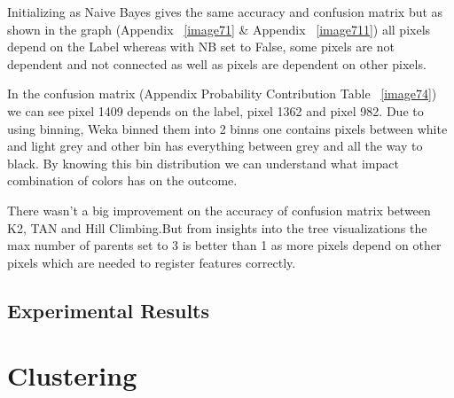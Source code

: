\documentclass[11pt]{article}
\begin{document}
Initializing as Naive Bayes gives the same accuracy and confusion matrix but as shown in the graph (Appendix ~\ref{image71} \& Appendix ~\ref{image711}) all pixels depend on the Label whereas with NB set to False, some pixels are not dependent and not connected as well as pixels are dependent on other pixels.

In the confusion matrix (Appendix Probability Contribution Table ~\ref{image74}) we can see pixel 1409 depends on the label, pixel 1362 and pixel 982. Due to using binning, Weka binned them into 2 binns one contains pixels between white and light grey and other bin has everything between grey and all the way to black. By knowing this bin distribution we can understand what impact combination of colors has on the outcome.

There wasn't a big improvement on the accuracy of confusion matrix between K2, TAN and Hill Climbing.But from insights into the tree visualizations the max number of parents set to 3 is better than 1 as more pixels depend on other pixels which are needed to register features correctly.


\subsection{Experimental Results}

\pagebreak

\section{Clustering}
\end{document}
